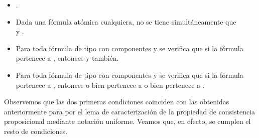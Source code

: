 \begin{isabellebody}
\begin{isamarkuptext}
\begin{demostracion}
    \begin{itemize}
      \item {}.
      \item Dada  una fórmula atómica cualquiera, no se tiene 
      simultáneamente que\\  y .
      \item Para toda fórmula de tipo \isa{{\isasymalpha}} con componentes  y  se verifica 
      que si la fórmula pertenece a , entonces  y  también.
      \item Para toda fórmula de tipo \isa{{\isasymbeta}} con componentes  y  se verifica 
      que si la fórmula pertenece a , entonces o bien  pertenece
      a  o bien  pertenece a .
    \end{itemize} 

    Observemos que las dos primeras condiciones coinciden con las obtenidas anteriormente para  
    por el lema de caracterización de la propiedad de consistencia proposicional mediante notación
    uniforme. Veamos que, en efecto, se cumplen el resto de condiciones.


\end{demostracion}
\end{isamarkuptext}
\end{isabellebody}
